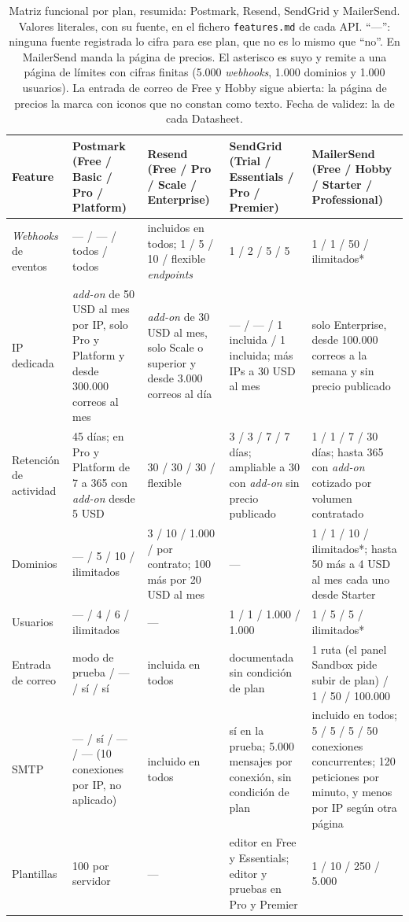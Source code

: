\begin{table}[H]
\centering
\scriptsize
\setlength{\tabcolsep}{3pt}
\begin{tabular}{|p{2cm}|p{3cm}|p{3cm}|p{3cm}|p{3.1cm}|}
\hline
\textbf{Feature} & \textbf{Postmark} (Free / Basic / Pro / Platform) & \textbf{Resend} (Free / Pro / Scale / Enterprise) & \textbf{SendGrid} (Trial / Essentials / Pro / Premier) & \textbf{MailerSend} (Free / Hobby / Starter / Professional) \\
\hline
\textit{Webhooks} de eventos & --- / --- / todos / todos & incluidos en todos; 1 / 5 / 10 / flexible \textit{endpoints} & 1 / 2 / 5 / 5 & 1 / 1 / 50 / ilimitados* \\
\hline
IP dedicada & \textit{add-on} de 50 USD al mes por IP, solo Pro y Platform y desde 300.000 correos al mes & \textit{add-on} de 30 USD al mes, solo Scale o superior y desde 3.000 correos al día & --- / --- / 1 incluida / 1 incluida; más IPs a 30 USD al mes & solo Enterprise, desde 100.000 correos a la semana y sin precio publicado \\
\hline
Retención de actividad & 45 días; en Pro y Platform de 7 a 365 con \textit{add-on} desde 5 USD & 30 / 30 / 30 / flexible & 3 / 3 / 7 / 7 días; ampliable a 30 con \textit{add-on} sin precio publicado & 1 / 1 / 7 / 30 días; hasta 365 con \textit{add-on} cotizado por volumen contratado \\
\hline
Dominios & --- / 5 / 10 / ilimitados & 3 / 10 / 1.000 / por contrato; 100 más por 20 USD al mes & --- & 1 / 1 / 10 / ilimitados*; hasta 50 más a 4 USD al mes cada uno desde Starter \\
\hline
Usuarios & --- / 4 / 6 / ilimitados & --- & 1 / 1 / 1.000 / 1.000 & 1 / 5 / 5 / ilimitados* \\
\hline
Entrada de correo & modo de prueba / --- / sí / sí & incluida en todos & documentada sin condición de plan & 1 ruta (el panel Sandbox pide subir de plan) / 1 / 50 / 100.000 \\
\hline
SMTP & --- / sí / --- / --- (10 conexiones por IP, no aplicado) & incluido en todos & sí en la prueba; 5.000 mensajes por conexión, sin condición de plan & incluido en todos; 5 / 5 / 5 / 50 conexiones concurrentes; 120 peticiones por minuto, y menos por IP según otra página \\
\hline
Plantillas & 100 por servidor & --- & editor en Free y Essentials; editor y pruebas en Pro y Premier & 1 / 10 / 250 / 5.000 \\
\hline
\end{tabular}
\caption{Matriz funcional por plan, resumida: Postmark, Resend, SendGrid y MailerSend.
Valores literales, con su fuente, en el fichero \texttt{features.md} de cada API.
``---'': ninguna fuente registrada lo cifra para ese plan, que no es lo mismo que
``no''. En MailerSend manda la página de precios. El asterisco es suyo y remite a una
página de límites con cifras finitas (5.000 \textit{webhooks}, 1.000 dominios y
1.000 usuarios). La entrada de correo de Free y Hobby sigue abierta: la página de precios la marca con iconos que no constan como texto. Fecha de validez: la de cada Datasheet.}
\label{tab:features}
\end{table}

